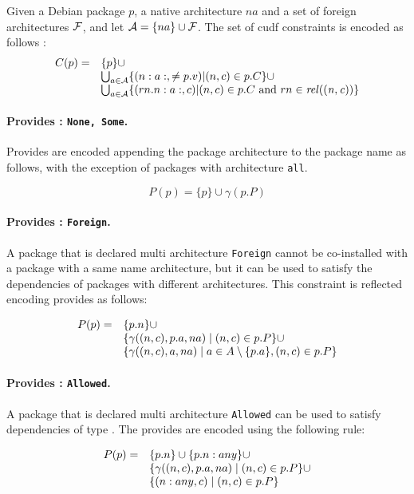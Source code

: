 Given a Debian package $p$, a native architecture $na$ and a set of
foreign architectures $\cal{F}$, and let $\cal{A} = \{ na \}
\cup \cal{F}$. The set of cudf constraints is encoded as follows : 
\[
  \begin{array}{rl}
    C(p) = & \{ p \} \cup \\ 
    & \bigcup_{a \in \cal{A}} \{ (n:a:, \neq p.v) | (n,c) \in p.C \} \cup \\
    & \bigcup_{a \in \cal{A}} \{ (\name{rn}:a:,c) | (n,c) \in p.C \mbox{ and } rn \in \rel{(n,c)} \} 
  \end{array}
\]

\paragraph{Provides : \texttt{None, Some}.}

Provides are encoded appending the package architecture to the package
name as follows, with the exception of packages with architecture
\texttt{all}.

\[
  P(p) = \{ p \} \cup \gamma(p.P)
\]

\paragraph{Provides : \texttt{Foreign}.}

A package that is declared multi architecture \texttt{Foreign} cannot
be co-installed with a package with a same name architecture, but it
can be used to satisfy the dependencies of packages with different
architectures. This constraint is reflected encoding provides as
follows:

\[
  \begin{array}{rl}
    P(p) = & \{ \name{p} \} \cup \\
    & \{ \gamma((n,c), \arch{p},na) \mid (n,c) \in p.P \} \cup \\
    & \{ \gamma((n,c),a,na) \mid a \in A \setminus \{ \arch{p} \}, (n,c) \in p.P \}
   \end{array}
\]

\paragraph{Provides : \texttt{Allowed}.}
A package that is declared multi architecture \texttt{Allowed} can be
used to satisfy dependencies of type \any{}. The provides are
encoded using the following rule:

\[
  \begin{array}{rl}
    P(p) = & \{ \name{p} \} \cup \{ \name{p}:any \} \cup \\
    & \{ \gamma((n,c), \arch{p},na) \mid (n,c) \in p.P \} \cup \\
    & \{ (n:any,c) \mid (n,c) \in p.P \} 
   \end{array}
\]
